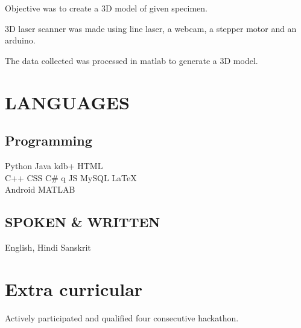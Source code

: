 \documentclass[]{deedy-resume-openfont}
\begin{document}
\begin{tightemize}
\item Objective was to create a 3D model of given specimen.
\item 3D laser scanner was made using line laser, a webcam, a stepper motor and an arduino.
\item The data collected was processed in matlab to generate a 3D model.
\linebreak
\end{tightemize}
\sectionsep


\section{LANGUAGES}

\begin{minipage}[t]{0.60\textwidth} 

\subsection{Programming}
Python \textbullet{}   Java \textbullet{} kdb+ \textbullet{} HTML \\
C++\textbullet{} CSS \textbullet{} C\# \textbullet{} q \textbullet{} JS \textbullet{} MySQL \textbullet{} \LaTeX\ \\
Android \textbullet{} MATLAB
\sectionsep

%
%

\end{minipage} 
\hfill
\begin{minipage}[t]{0.30\textwidth} 

\subsection{SPOKEN \& WRITTEN}
English, Hindi
Sanskrit
\sectionsep

\end{minipage} 

\sectionsep


\section{Extra curricular}
\begin{tightemize}
\item{Actively participated and qualified four consecutive hackathon.}
\end{tightemize}
\sectionsep
\end{document}
